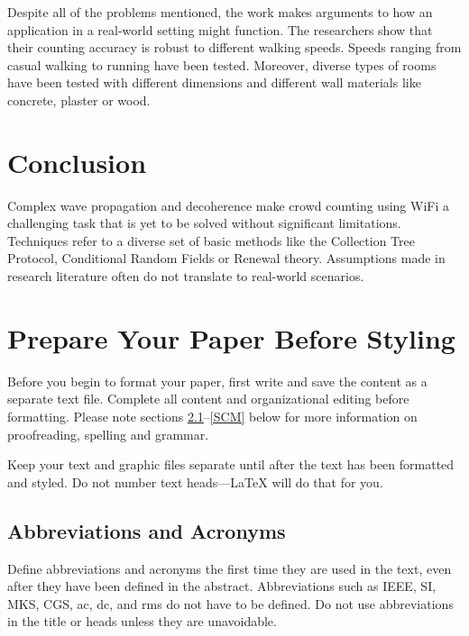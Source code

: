 \documentclass[conference]{IEEEtran}
\begin{document}
Despite all of the problems mentioned, the work makes arguments to how an application in a real-world setting might function. The researchers show that their counting accuracy is robust to different walking speeds. Speeds ranging from casual walking to running have been tested. Moreover, diverse types of rooms have been tested with different dimensions and different wall materials like concrete, plaster or wood.

\section{Conclusion}
Complex wave propagation and decoherence make crowd counting using WiFi a challenging task that is yet to be solved without significant limitations. Techniques refer to a diverse set of basic methods like the Collection Tree Protocol, Conditional Random Fields or Renewal theory. Assumptions made in research literature often do not translate to real-world scenarios.

\section{Prepare Your Paper Before Styling}
Before you begin to format your paper, first write and save the content as a 
separate text file. Complete all content and organizational editing before 
formatting. Please note sections \ref{AA}--\ref{SCM} below for more information on 
proofreading, spelling and grammar.

Keep your text and graphic files separate until after the text has been 
formatted and styled. Do not number text heads---{\LaTeX} will do that 
for you.

\subsection{Abbreviations and Acronyms}\label{AA}
Define abbreviations and acronyms the first time they are used in the text, 
even after they have been defined in the abstract. Abbreviations such as 
IEEE, SI, MKS, CGS, ac, dc, and rms do not have to be defined. Do not use 
abbreviations in the title or heads unless they are unavoidable.
\end{document}
